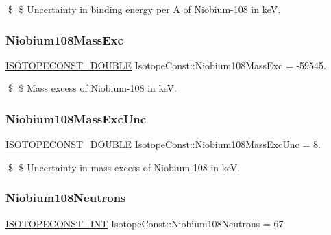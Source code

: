 \$ \$ Uncertainty in binding energy per A of Niobium-\/108 in keV. \mbox{\label{group___isotope_const-_niobium-_nb108_gad38a57828fa0ccc697cec3d73065b8e4}} 
\subsubsection{\texorpdfstring{Niobium108\+Mass\+Exc}{Niobium108MassExc}}
{\footnotesize\ttfamily \mbox{\hyperlink{group___isotope_const-_macros_ga8f45a7272ce02c0b4c65c44636ed719a}{I\+S\+O\+T\+O\+P\+E\+C\+O\+N\+S\+T\+\_\+\+D\+O\+U\+B\+LE}} Isotope\+Const\+::\+Niobium108\+Mass\+Exc = -\/59545.}

\$ \$ Mass excess of Niobium-\/108 in keV. \mbox{\label{group___isotope_const-_niobium-_nb108_gad1cad19eb962d98c0203ccd77cba876a}} 
\subsubsection{\texorpdfstring{Niobium108\+Mass\+Exc\+Unc}{Niobium108MassExcUnc}}
{\footnotesize\ttfamily \mbox{\hyperlink{group___isotope_const-_macros_ga8f45a7272ce02c0b4c65c44636ed719a}{I\+S\+O\+T\+O\+P\+E\+C\+O\+N\+S\+T\+\_\+\+D\+O\+U\+B\+LE}} Isotope\+Const\+::\+Niobium108\+Mass\+Exc\+Unc = 8.}

\$ \$ Uncertainty in mass excess of Niobium-\/108 in keV. \mbox{\label{group___isotope_const-_niobium-_nb108_ga6ece12d8ae0cd6433fe5ae746fcd9c46}} 
\subsubsection{\texorpdfstring{Niobium108\+Neutrons}{Niobium108Neutrons}}
{\footnotesize\ttfamily \mbox{\hyperlink{group___isotope_const-_macros_ga5f18360b3e99483a35c32d789e62621c}{I\+S\+O\+T\+O\+P\+E\+C\+O\+N\+S\+T\+\_\+\+I\+NT}} Isotope\+Const\+::\+Niobium108\+Neutrons = 67}

